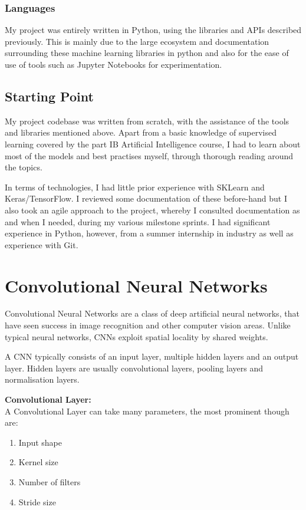 \documentclass[12pt,a4paper,twoside]{report}
\begin{document}
\subsubsection{Languages}

My project was entirely written in Python, using the libraries and APIs described previously. This is mainly due to the large ecosystem and documentation surrounding these machine learning libraries in python and also for the ease of use of tools such as Jupyter Notebooks for experimentation.

\subsection{Starting Point}

My project codebase was written from scratch, with the assistance of the tools and libraries mentioned above. Apart from a basic knowledge of supervised learning covered by the part IB Artificial Intelligence course, I had to learn about most of the models and best practises myself, through thorough reading around the topics. 


In terms of technologies, I had little prior experience with SKLearn and Keras/TensorFlow. I reviewed some documentation of these before-hand but I also took an agile approach to the project, whereby I consulted documentation as and when I needed, during my various milestone sprints. I had significant experience in Python, however, from a summer internship in industry as well as experience with Git.


\section{Convolutional Neural Networks}
Convolutional Neural Networks are a class of deep artificial neural networks, that have seen success in image recognition and other computer vision areas. Unlike typical neural networks, CNNs exploit spatial locality by shared weights. 

A CNN typically consists of an input layer, multiple hidden layers and an output layer. Hidden layers are usually convolutional layers, pooling layers and normalisation layers. 

\textbf{Convolutional Layer:}\\
A Convolutional Layer can take many parameters, the most prominent though are: 
\begin{enumerate}
  \item Input shape
  \item Kernel size
  \item Number of filters
  \item Stride size
\end{enumerate}
\end{document}

